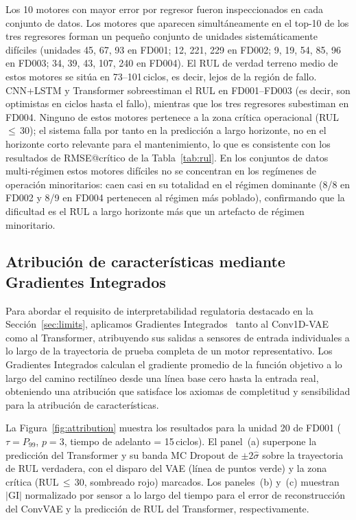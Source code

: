 \documentclass[5p,times,authoryear]{elsarticle}
\begin{document}
Los 10 motores con mayor error por regresor fueron inspeccionados en cada conjunto de datos. Los motores que aparecen simultáneamente en el top-10 de los tres regresores forman un pequeño conjunto de unidades sistemáticamente difíciles (unidades 45, 67, 93 en FD001; 12, 221, 229 en FD002; 9, 19, 54, 85, 96 en FD003; 34, 39, 43, 107, 240 en FD004). El RUL de verdad terreno medio de estos motores se sitúa en 73--101\,ciclos, es decir, lejos de la región de fallo. CNN+LSTM y Transformer sobreestiman el RUL en FD001--FD003 (es decir, son optimistas en ciclos hasta el fallo), mientras que los tres regresores subestiman en FD004. Ninguno de estos motores pertenece a la zona crítica operacional (RUL\,$\le$\,30); el sistema falla por tanto en la predicción a largo horizonte, no en el horizonte corto relevante para el mantenimiento, lo que es consistente con los resultados de RMSE@crítico de la Tabla~\ref{tab:rul}. En los conjuntos de datos multi-régimen estos motores difíciles no se concentran en los regímenes de operación minoritarios: caen casi en su totalidad en el régimen dominante (8/8 en FD002 y 8/9 en FD004 pertenecen al régimen más poblado), confirmando que la dificultad es el RUL a largo horizonte más que un artefacto de régimen minoritario.

\subsection{Atribución de características mediante Gradientes Integrados}\label{sec:results-attribution}

Para abordar el requisito de interpretabilidad regulatoria destacado en la Sección~\ref{sec:limits}, aplicamos Gradientes Integrados~\citep{sundararajan2017axiomatic} tanto al Conv1D-VAE como al Transformer, atribuyendo sus salidas a sensores de entrada individuales a lo largo de la trayectoria de prueba completa de un motor representativo. Los Gradientes Integrados calculan el gradiente promedio de la función objetivo a lo largo del camino rectilíneo desde una línea base cero hasta la entrada real, obteniendo una atribución que satisface los axiomas de completitud y sensibilidad para la atribución de características.

La Figura~\ref{fig:attribution} muestra los resultados para la unidad 20 de FD001 ($\tau{=}P_{99}$, $p{=}3$, tiempo de adelanto = 15\,ciclos). El panel~(a) superpone la predicción del Transformer y su banda MC Dropout de $\pm 2\hat\sigma$ sobre la trayectoria de RUL verdadera, con el disparo del VAE (línea de puntos verde) y la zona crítica (RUL\,$\le$\,30, sombreado rojo) marcados. Los paneles~(b) y~(c) muestran $|\mathrm{GI}|$ normalizado por sensor a lo largo del tiempo para el error de reconstrucción del ConvVAE y la predicción de RUL del Transformer, respectivamente.
\end{document}
